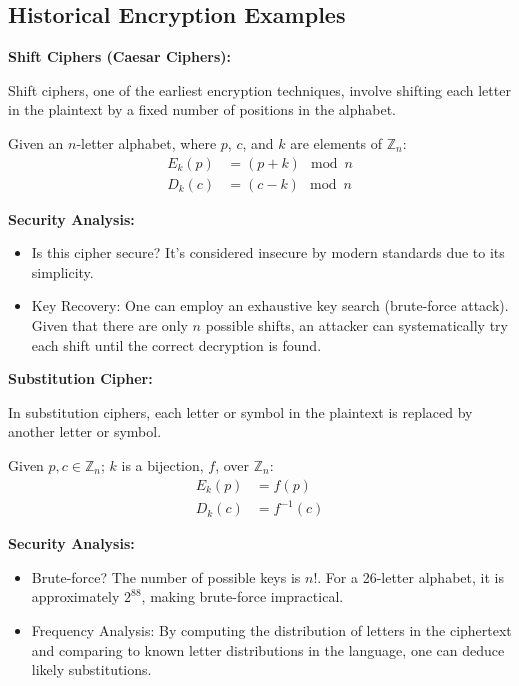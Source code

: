 \documentclass[12pt]{article}
\begin{document}
\subsection*{Historical Encryption Examples}

\noindent\textbf{Shift Ciphers (Caesar Ciphers):}

Shift ciphers, one of the earliest encryption techniques, involve shifting each letter in the plaintext by a fixed number of positions in the alphabet.

Given an \( n \)-letter alphabet, where \( p \), \( c \), and \( k \) are elements of \( \mathbb{Z}_n \):
\begin{align*}
    E_k(p) &= (p + k) \mod n \\
    D_k(c) &= (c - k) \mod n
\end{align*}

\textbf{Security Analysis:} 
\begin{itemize}
    \item Is this cipher secure? It's considered insecure by modern standards due to its simplicity.
    \item Key Recovery: One can employ an exhaustive key search (brute-force attack). Given that there are only \( n \) possible shifts, an attacker can systematically try each shift until the correct decryption is found.
\end{itemize}

\noindent\textbf{Substitution Cipher:}

In substitution ciphers, each letter or symbol in the plaintext is replaced by another letter or symbol.

Given \( p, c \in \mathbb{Z}_n \); \( k \) is a bijection, \( f \), over \( \mathbb{Z}_n \):
\begin{align*}
    E_k(p) &= f(p) \\
    D_k(c) &= f^{-1}(c)
\end{align*}

\textbf{Security Analysis:}
\begin{itemize}
    \item Brute-force? The number of possible keys is \( n! \). For a 26-letter alphabet, it is approximately \( 2^{88} \), making brute-force impractical.
    \item Frequency Analysis: By computing the distribution of letters in the ciphertext and comparing to known letter distributions in the language, one can deduce likely substitutions.
\end{itemize}
\end{document}
